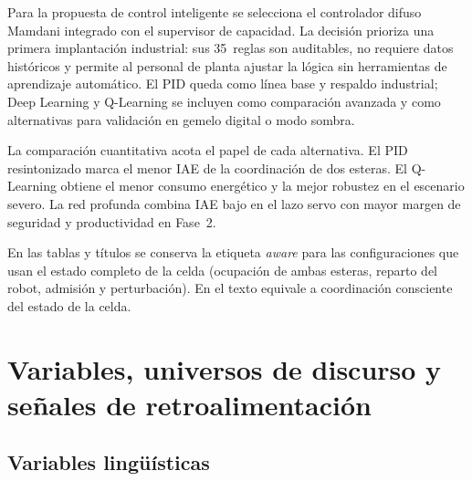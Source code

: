 Para la propuesta de control inteligente se selecciona el controlador difuso Mamdani integrado con el supervisor de capacidad. La decisión prioriza una primera implantación industrial: sus 35~reglas son auditables, no requiere datos históricos y permite al personal de planta ajustar la lógica sin herramientas de aprendizaje automático. El PID queda como línea base y respaldo industrial; Deep Learning y Q-Learning se incluyen como comparación avanzada y como alternativas para validación en gemelo digital o modo sombra.

La comparación cuantitativa acota el papel de cada alternativa. El PID resintonizado marca el menor IAE de la coordinación de dos esteras. El Q-Learning obtiene el menor consumo energético y la mejor robustez en el escenario severo. La red profunda combina IAE bajo en el lazo servo con mayor margen de seguridad y productividad en Fase~2.

En las tablas y títulos se conserva la etiqueta \emph{aware} para las configuraciones que usan el estado completo de la celda (ocupación de ambas esteras, reparto del robot, admisión y perturbación). En el texto equivale a coordinación consciente del estado de la celda.

\section{Variables, universos de discurso y señales de retroalimentación}

\subsection*{Variables lingüísticas}

